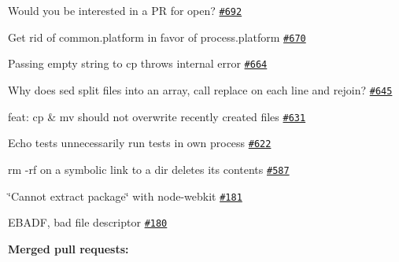 \begin{DoxyItemize}
\item Would you be interested in a PR for {\ttfamily open}? \href{https://github.com/shelljs/shelljs/issues/692}{\tt \#692}
\item Get rid of common.\+platform in favor of process.\+platform \href{https://github.com/shelljs/shelljs/issues/670}{\tt \#670}
\item Passing empty string to cp throws internal error \href{https://github.com/shelljs/shelljs/issues/664}{\tt \#664}
\item Why does sed split files into an array, call replace on each line and rejoin? \href{https://github.com/shelljs/shelljs/issues/645}{\tt \#645}
\item feat\+: cp \& mv should not overwrite recently created files \href{https://github.com/shelljs/shelljs/issues/631}{\tt \#631}
\item Echo tests unnecessarily run tests in own process \href{https://github.com/shelljs/shelljs/issues/622}{\tt \#622}
\item rm -\/rf on a symbolic link to a dir deletes its contents \href{https://github.com/shelljs/shelljs/issues/587}{\tt \#587}
\item \char`\"{}\+Cannot extract package\char`\"{} with node-\/webkit \href{https://github.com/shelljs/shelljs/issues/181}{\tt \#181}
\item E\+B\+A\+DF, bad file descriptor \href{https://github.com/shelljs/shelljs/issues/180}{\tt \#180}
\end{DoxyItemize}

{\bfseries Merged pull requests\+:}


